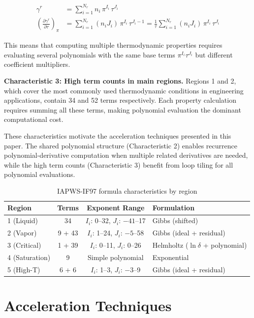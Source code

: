 \documentclass{article}
\begin{document}
\begin{align}
\gamma^r &= \sum_{i=1}^{N_r} n_i \, \pi^{I_i} \, \tau^{J_i} \\
\left( \frac{\partial \gamma^r}{\partial \tau} \right)_\pi &= \sum_{i=1}^{N_r} (n_i J_i) \, \pi^{I_i} \, \tau^{J_i - 1} =\frac{1}{\tau} \sum_{i=1}^{N_r} (n_i J_i) \, \pi^{I_i} \, \tau^{J_i}
\end{align}

This means that computing multiple thermodynamic properties requires evaluating several polynomials with the same base terms $\pi^{I_i} \tau^{J_i}$ but different coefficient multipliers.

\textbf{Characteristic 3: High term counts in main regions.} Regions 1 and 2, which cover the most commonly used thermodynamic conditions in engineering applications, contain 34 and 52 terms respectively. Each property calculation requires summing all these terms, making polynomial evaluation the dominant computational cost.

These characteristics motivate the acceleration techniques presented in this paper. The shared polynomial structure (Characteristic 2) enables recurrence polynomial-derivative computation when multiple related derivatives are needed, while the high term counts (Characteristic 3) benefit from loop tiling for all polynomial evaluations.

\begin{table}[H]
\centering
\caption{IAPWS-IF97 formula characteristics by region}
\label{tab:formula_char}
\begin{tabular}{lccl}
\toprule
\textbf{Region} & \textbf{Terms} & \textbf{Exponent Range} & \textbf{Formulation} \\
\midrule
1 (Liquid) & 34 & $I_i$: 0--32, $J_i$: $-41$--17 & Gibbs (shifted) \\
2 (Vapor) & 9 + 43 & $I_i$: 1--24, $J_i$: $-5$--58 & Gibbs (ideal + residual) \\
3 (Critical) & 1 + 39 & $I_i$: 0--11, $J_i$: 0--26 & Helmholtz ($\ln\delta$ + polynomial) \\
4 (Saturation) & 9 & Simple polynomial & Exponential \\
5 (High-T) & 6 + 6 & $I_i$: 1--3, $J_i$: $-3$--9 & Gibbs (ideal + residual) \\
\bottomrule
\end{tabular}
\end{table}

\section{Acceleration Techniques}
\end{document}
